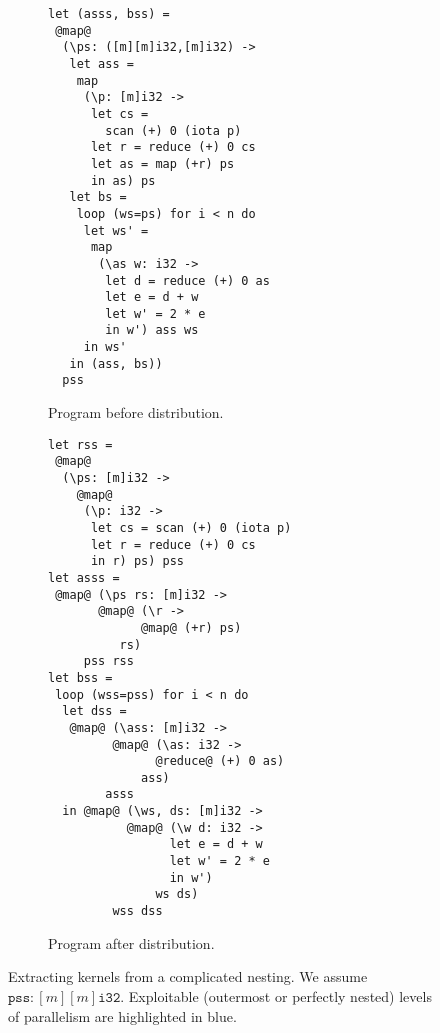 \begin{figure}
\begin{subfigure}[b]{0.48\columnwidth}
\begin{lstlisting}[basicstyle=\scriptsize\ttfamily,numbers=none,xleftmargin=0pt,moredelim={[is][\color{blue}\bfseries]{@}{@}}]
let (asss, bss) =
 @map@
  (\ps: ([m][m]i32,[m]i32) ->
   let ass =
    map
     (\p: [m]i32 ->
      let cs =
        scan (+) 0 (iota p)
      let r = reduce (+) 0 cs
      let as = map (+r) ps
      in as) ps
   let bs =
    loop (ws=ps) for i < n do
     let ws' =
      map
       (\as w: i32 ->
        let d = reduce (+) 0 as
        let e = d + w
        let w' = 2 * e
        in w') ass ws
     in ws'
   in (ass, bs))
  pss
\end{lstlisting}
\caption{Program before distribution.}
\label{fig:before-distrib}
\end{subfigure}
\hfill
\begin{subfigure}[b]{0.49\columnwidth}
\begin{lstlisting}[basicstyle=\scriptsize\ttfamily,numbers=none,xleftmargin=0pt,moredelim={[is][\color{blue}\bfseries]{@}{@}}]
let rss =
 @map@
  (\ps: [m]i32 ->
    @map@
     (\p: i32 ->
      let cs = scan (+) 0 (iota p)
      let r = reduce (+) 0 cs
      in r) ps) pss
let asss =
 @map@ (\ps rs: [m]i32 ->
       @map@ (\r ->
             @map@ (+r) ps)
          rs)
     pss rss
let bss =
 loop (wss=pss) for i < n do
  let dss =
   @map@ (\ass: [m]i32 ->
         @map@ (\as: i32 ->
               @reduce@ (+) 0 as)
             ass)
        asss
  in @map@ (\ws, ds: [m]i32 ->
           @map@ (\w d: i32 ->
                 let e = d + w
                 let w' = 2 * e
                 in w')
               ws ds)
         wss dss
\end{lstlisting}
\caption{Program after distribution.}
\label{fig:after-result}
\end{subfigure}
\caption{Extracting kernels from a complicated nesting.  We assume
  $\texttt{pss} : [m][m]\texttt{i32}$.  Exploitable (outermost or perfectly
  nested) levels of parallelism are highlighted in blue.}
\end{figure}

